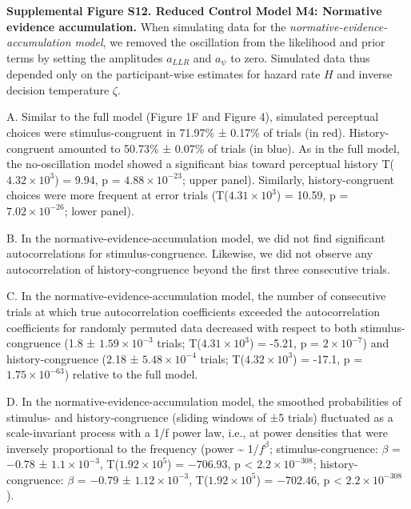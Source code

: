 \documentclass[
]{article}
\begin{document}
\textbf{Supplemental Figure S12. Reduced Control Model M4: Normative
evidence accumulation.} When simulating data for the
\emph{normative-evidence-accumulation model}, we removed the oscillation
from the likelihood and prior terms by setting the amplitudes
\(a_{LLR}\) and \(a_{\psi}\) to zero. Simulated data thus depended only
on the participant-wise estimates for hazard rate \(H\) and inverse
decision temperature \(\zeta\).

A. Similar to the full model (Figure 1F and Figure 4), simulated
perceptual choices were stimulus-congruent in 71.97\% ± 0.17\% of trials
(in red). History-congruent amounted to 50.73\% ± 0.07\% of trials (in
blue). As in the full model, the no-oscillation model showed a
significant bias toward perceptual history
T(\ensuremath{4.32\times 10^{3}}) = 9.94, p =
\(\ensuremath{4.88\times 10^{-23}}\); upper panel). Similarly,
history-congruent choices were more frequent at error trials
(T(\ensuremath{4.31\times 10^{3}}) = 10.59, p =
\(\ensuremath{7.02\times 10^{-26}}\); lower panel).

B. In the normative-evidence-accumulation model, we did not find
significant autocorrelations for stimulus-congruence. Likewise, we did
not observe any autocorrelation of history-congruence beyond the first
three consecutive trials.

C. In the normative-evidence-accumulation model, the number of
consecutive trials at which true autocorrelation coefficients exceeded
the autocorrelation coefficients for randomly permuted data decreased
with respect to both stimulus-congruence (1.8 ±
\ensuremath{1.59\times 10^{-3}} trials;
T(\ensuremath{4.31\times 10^{3}}) = -5.21, p =
\(\ensuremath{2\times 10^{-7}}\)) and history-congruence (2.18 ±
\ensuremath{5.48\times 10^{-4}} trials;
T(\ensuremath{4.32\times 10^{3}}) = -17.1, p =
\(\ensuremath{1.75\times 10^{-63}}\)) relative to the full model.

D. In the normative-evidence-accumulation model, the smoothed
probabilities of stimulus- and history-congruence (sliding windows of ±5
trials) fluctuated as a scale-invariant process with a 1/f power law,
i.e., at power densities that were inversely proportional to the
frequency (power \textasciitilde{} 1/\(f^\beta\); stimulus-congruence:
\(\beta\) = \(-0.78\) ± \(\ensuremath{1.1\times 10^{-3}}\),
T(\(\ensuremath{1.92\times 10^{5}}\)) = \(-706.93\), p < \(\ensuremath{2.2\times 10^{-308}}\);
history-congruence: \(\beta\) = \(-0.79\) ±
\(\ensuremath{1.12\times 10^{-3}}\),
T(\(\ensuremath{1.92\times 10^{5}}\)) = \(-702.46\), p < \(\ensuremath{2.2\times 10^{-308}}\)).
\end{document}
